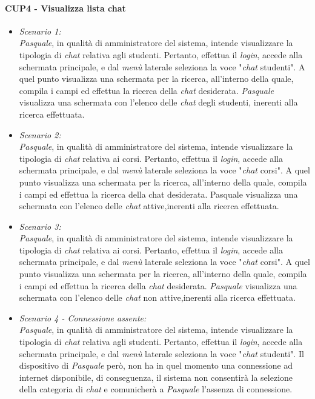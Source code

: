 \paragraph{CUP4 - Visualizza lista chat\\}
\begin{itemize}
	\item \textit{Scenario 1:\\}
	\textit{Pasquale}, in qualità di amministratore del sistema, intende visualizzare la tipologia di \textit{chat} relativa agli studenti. Pertanto, effettua il \textit{login}, accede alla schermata principale, e dal \textit{menù} laterale seleziona la voce "\textit{chat} studenti". A quel punto visualizza una schermata per la ricerca, all’interno della quale, compila i campi ed effettua la ricerca della \textit{chat} desiderata. \textit{Pasquale} visualizza una schermata con l’elenco delle \textit{chat} degli studenti, inerenti alla ricerca effettuata.\\
	
	\item \textit{Scenario 2:\\}
	\textit{Pasquale}, in qualità di amministratore del sistema, intende visualizzare la tipologia di \textit{chat} relativa ai corsi. Pertanto, effettua il \textit{login}, accede alla schermata principale, e dal \textit{menù} laterale seleziona la voce "\textit{chat} corsi". A quel punto visualizza una schermata per la ricerca, all’interno della quale, compila i campi ed effettua la ricerca della chat desiderata. Pasquale visualizza una schermata con l’elenco delle \textit{chat} attive,inerenti alla ricerca effettuata.\\
	
	\item \textit{Scenario 3:\\}
	\textit{Pasquale}, in qualità di amministratore del sistema, intende visualizzare la tipologia di \textit{chat} relativa ai corsi. Pertanto, effettua il \textit{login}, accede alla schermata principale, e dal \textit{menù} laterale seleziona la voce "\textit{chat} corsi".  A quel punto visualizza una schermata per la ricerca, all’interno della quale, compila i campi ed effettua la ricerca della \textit{chat} desiderata. \textit{Pasquale} visualizza una schermata con l’elenco delle \textit{chat} non attive,inerenti alla ricerca effettuata.\\
	
	\item \textit{Scenario 4 - Connessione assente:\\}
	\textit{Pasquale}, in qualità di amministratore del sistema, intende visualizzare la tipologia di \textit{chat} relativa agli studenti. Pertanto, effettua il \textit{login}, accede alla schermata principale, e dal \textit{menù} laterale seleziona la voce "\textit{chat} studenti". Il dispositivo di \textit{Pasquale} però, non ha in quel momento una connessione ad internet disponibile, di conseguenza, il sistema non consentirà la selezione della categoria di \textit{chat} e comunicherà a \textit{Pasquale} l’assenza di connessione.\\
	

\end{itemize}
